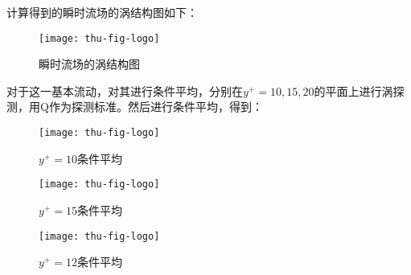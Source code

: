 计算得到的瞬时流场的涡结构图如下：
\begin{figure}
  \centering
  \texttt{[image: thu-fig-logo]}
  \caption{瞬时流场的涡结构图}
\end{figure}
对于这一基本流动，对其进行条件平均，分别在$y^+=10,15,20$的平面上进行涡探测，用Q作为探测标准。然后进行条件平均，得到：
\begin{figure}
  \centering
  \texttt{[image: thu-fig-logo]}
  \caption{$y^+=10$条件平均}
\end{figure}
\begin{figure}
  \centering
  \texttt{[image: thu-fig-logo]}
  \caption{$y^+=15$条件平均}
\end{figure}
\begin{figure}
  \centering
  \texttt{[image: thu-fig-logo]}
  \caption{$y^+=12$条件平均}
\end{figure}

